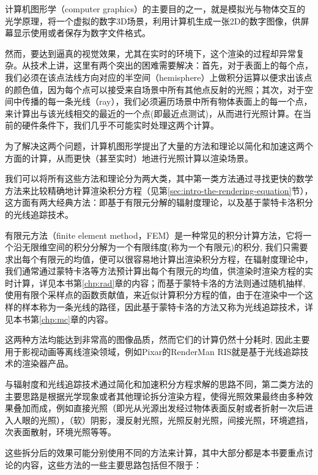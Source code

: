 计算机图形学（computer graphics）的主要目的之一，就是模拟光与物体交互的光学原理，将一个虚拟的数字3D场景，利用计算机生成一张2D的数字图像，供屏幕显示使用或者保存为数字文件格式。

然而，要达到逼真的视觉效果，尤其在实时的环境下，这个渲染的过程却异常复杂。从技术上讲，这里有两个突出的困难需要解决：首先，对于表面上的每个点，我们必须在该点法线方向对应的半空间（hemisphere）上做积分运算以便求出该点的颜色值，因为每个点可以接受来自场景中所有其他点反射的光照；其次，对于空间中传播的每一条光线（ray），我们必须遍历场景中所有物体表面上的每一个点，来计算出与该光线相交的最近的一个点(即最近点测试)，从而进行光照计算。在当前的硬件条件下，我们几乎不可能实时处理这两个计算。

为了解决这两个问题，计算机图形学提出了大量的方法和理论以简化和加速这两个方面的计算，从而更快（甚至实时）地进行光照计算以渲染场景。

我们可以将所有这些方法和理论分为两大类，其中第一类方法通过寻找更快的数学方法来比较精确地计算渲染积分方程（见第\ref{sec:intro-the-rendering-equation}节），这方面有两大经典方法：即基于有限元分解的辐射度理论，以及基于蒙特卡洛积分的光线追踪技术。

有限元方法（finite element method，FEM）是一种常见的积分计算方法，它将一个沿无限维空间的积分分解为一个有限纬度(称为一个有限元)的积分, 我们只需要求出每个有限元的均值，便可以很容易地计算出渲染积分方程，在辐射度理论中，我们通常通过蒙特卡洛等方法预计算出每个有限元的均值，供渲染时渲染方程的实时计算，详见本书第\ref{chp:rad}章的内容；而基于蒙特卡洛的方法则通过随机抽样, 使用有限个采样点的函数贡献值，来近似计算积分方程的值，由于在渲染中一个这样的样本称为一条光线的路径，因此基于蒙特卡洛的方法又称为光线追踪技术，详见本书第\ref{chp:mc}章的内容。

这两种方法均能达到非常高的图像品质，然而它们的计算仍然十分耗时, 因此主要用于影视动画等离线渲染领域，例如Pixar的RenderMan RIS就是基于光线追踪技术的渲染器产品。

与辐射度和光线追踪技术通过简化和加速积分方程求解的思路不同，第二类方法的主要思路是根据光学现象或者其他理论拆分渲染方程，使得光照效果最终由多种效果叠加而成，例如直接光照（即光从光源出发经过物体表面反射或者折射一次后进入人眼的光照），（软）阴影，漫反射光照，光照反射光照，间接光照，环境遮挡，次表面散射，环境光照等等。

这些拆分后的效果可能分别使用不同的方法来计算，其中大部分都是本书要重点讨论的内容，这些方法的一些主要思路包括但不限于：

